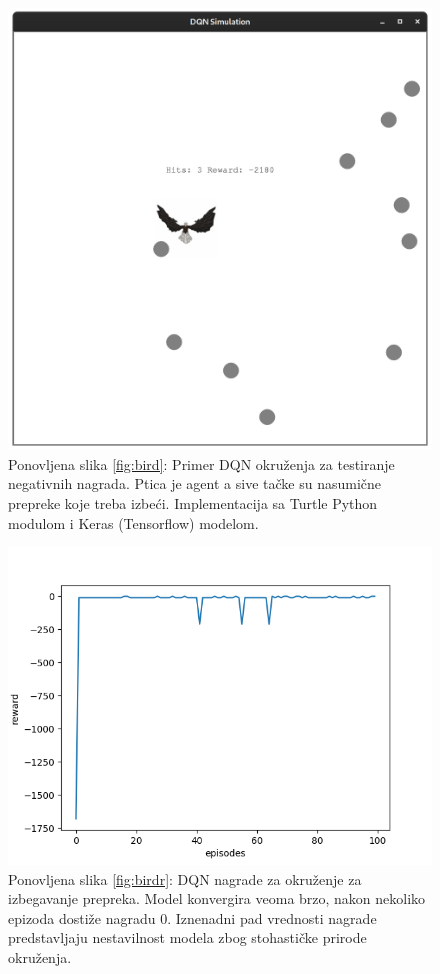 \begin{figure}[!ht]
  \centering
  \includegraphics[scale=0.1]{figures/dqn_bird.png} 
  {\vskip 0cm Ponovljena slika \ref{fig:bird}: Primer DQN okruženja za testiranje negativnih nagrada. Ptica je agent a sive tačke su nasumične prepreke koje treba izbeći. Implementacija sa Turtle Python modulom i Keras (Tensorflow) modelom.}
\end{figure}

\begin{figure}[!ht]
  \centering
  \includegraphics[scale=0.65]{figures/dqn_results.png} 
  {\vskip 0cm Ponovljena slika \ref{fig:birdr}: DQN nagrade za okruženje za izbegavanje prepreka. Model konvergira veoma brzo, nakon nekoliko epizoda dostiže nagradu $ 0 $. Iznenadni pad vrednosti nagrade predstavljaju nestavilnost modela zbog stohastičke prirode okruženja.}
\end{figure}

